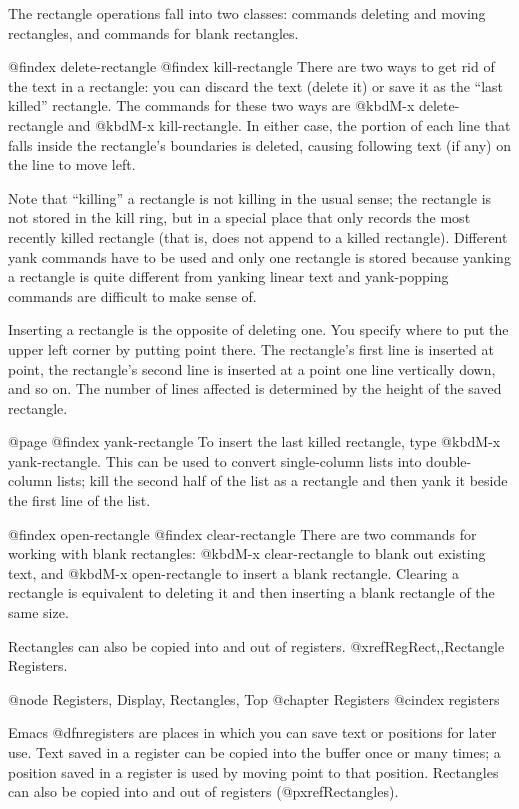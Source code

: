 {{{{  The rectangle operations fall into two classes: commands deleting and
moving rectangles, and commands for blank rectangles.

@findex delete-rectangle
@findex kill-rectangle
  There are two ways to get rid of the text in a rectangle: you can discard
the text (delete it) or save it as the ``last killed'' rectangle.  The
commands for these two ways are @kbd{M-x delete-rectangle} and @kbd{M-x
kill-rectangle}.  In either case, the portion of each line that falls inside
the rectangle's boundaries is deleted, causing following text (if any) on
the line to move left.

  Note that ``killing'' a rectangle is not killing in the usual sense; the
rectangle is not stored in the kill ring, but in a special place that
only records the most recently killed rectangle (that is, does not
append to a killed rectangle).  Different yank commands
have to be used and only one rectangle is stored because yanking
a rectangle is quite different from yanking linear text and yank-popping
commands are difficult to make sense of.

  Inserting a rectangle is the opposite of deleting one.  You specify
where to put the upper left corner by putting point there.  The
rectangle's first line is inserted at point, the rectangle's second line
is inserted at a point one line vertically down, and so on.  The number
of lines affected is determined by the height of the saved rectangle.

@page
@findex yank-rectangle
  To insert the last killed rectangle, type @kbd{M-x yank-rectangle}.
This can be used to convert single-column lists into double-column
lists; kill the second half of the list as a rectangle and then
yank it beside the first line of the list.

@findex open-rectangle
@findex clear-rectangle
  There are two commands for working with blank rectangles: @kbd{M-x
clear-rectangle} to blank out existing text, and @kbd{M-x open-rectangle}
to insert a blank rectangle.  Clearing a rectangle is equivalent to
deleting it and then inserting a blank rectangle of the same size.

  Rectangles can also be copied into and out of registers.
@xref{RegRect,,Rectangle Registers}.

@node Registers, Display, Rectangles, Top
@chapter Registers
@cindex registers

  Emacs @dfn{registers} are places in which you can save text or
positions for later use.  Text saved in a register can be copied into
the buffer once or many times; a position saved in a register is used by
moving point to that position.  Rectangles can also be copied into and
out of registers (@pxref{Rectangles}).

}}}}
